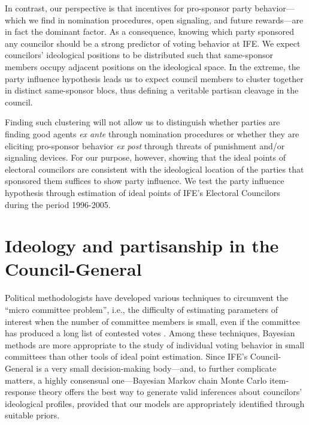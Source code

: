 \documentclass[12 pt, letter]{article}
\begin{document}
In contrast, our perspective is that incentives for pro-sponsor party behavior---which we find in nomination procedures, open signaling, and future rewards---are in fact the dominant factor.  As a consequence, knowing which party sponsored any councilor should be a strong predictor of voting behavior at IFE. We expect councilors' ideological positions to be distributed such that same-sponsor members occupy adjacent positions on the ideological space. In the extreme, the party influence hypothesis leads us to expect council members to cluster together in distinct same-sponsor blocs, thus defining a veritable partisan cleavage in the council.

Finding such clustering will not allow us to distinguish whether parties are finding good agents \emph{ex ante} through nomination procedures or whether they are eliciting pro-sponsor behavior \emph{ex post} through threats of punishment and/or signaling devices.  For our purpose, however, showing that the ideal points of electoral councilors are consistent with the ideological location of the parties that sponsored them suffices to show party influence. We test the party influence hypothesis through estimation of ideal points of IFE's Electoral Councilors during the period 1996-2005.

\singlespacing

\section{Ideology and partisanship in the Council-General}\label{S:estimation}

\doublespacing Political methodologists have developed various techniques to circumvent the ``micro committee problem'', i.e., the difficulty of estimating parameters of interest when the number of committee members is small, even if the committee has produced a long list of contested votes \citep{Londregan2000}.  Among these techniques, Bayesian methods \citep{Martin2002, Clinton2004, Jackman2001} are more appropriate to the study of individual voting behavior in small committees than other tools of ideal point estimation.  Since IFE's Council-General is a very small decision-making body---and, to further complicate matters, a highly consensual one---Bayesian Markov chain Monte Carlo item-response theory  offers the best way to generate valid inferences about councilors' ideological profiles, provided that our models are appropriately identified through suitable priors.
\end{document}
